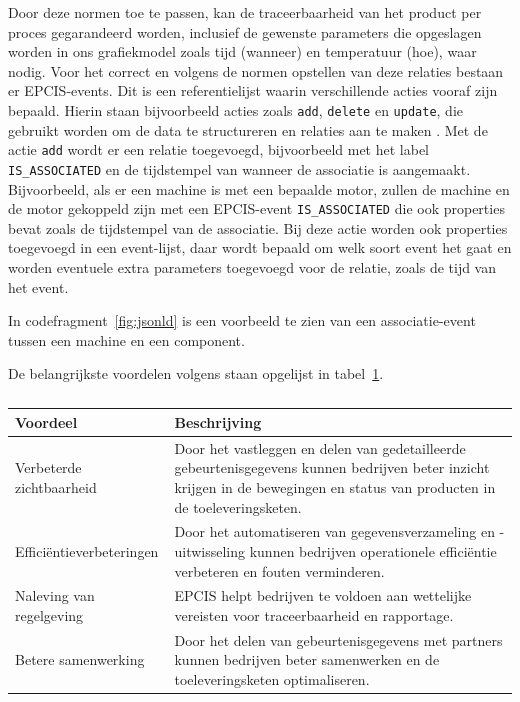 Door deze normen toe te passen, kan de traceerbaarheid van het product per proces gegarandeerd worden, inclusief de gewenste parameters die opgeslagen worden in ons grafiekmodel zoals tijd (wanneer) en temperatuur (hoe), waar nodig.
Voor het correct en volgens de normen opstellen van deze relaties bestaan er EPCIS-events. Dit is een referentielijst waarin verschillende acties vooraf zijn bepaald.
Hierin staan bijvoorbeeld acties zoals \texttt{add}, \texttt{delete} en \texttt{update}, die gebruikt worden om de data te structureren en relaties aan te maken \autocite{Byun2020}.
Met de actie \texttt{add} wordt er een relatie toegevoegd, bijvoorbeeld met het label \texttt{IS\_ASSOCIATED} en de tijdstempel van wanneer de associatie is aangemaakt.
Bijvoorbeeld, als er een machine is met een bepaalde motor, zullen de machine en de motor gekoppeld zijn met een EPCIS-event \texttt{IS\_ASSOCIATED} die ook properties bevat zoals de tijdstempel van de associatie.
Bij deze actie worden ook properties toegevoegd in een event-lijst, daar wordt bepaald om welk soort event het gaat en worden eventuele extra parameters toegevoegd voor de relatie, zoals de tijd van het event.

In codefragment~\ref{fig:jsonld} is een voorbeeld te zien van een associatie-event tussen een machine en een component.

De belangrijkste voordelen volgens \textcite{GS12025} staan opgelijst in tabel~\ref{tab:epcis-voordelen}.
\begin{table}[H]
    \centering
     \begin{tabular}{lp{}}
          \toprule
          \textbf{Voordeel} & \textbf{Beschrijving} \\
          \toprule
          Verbeterde zichtbaarheid & Door het vastleggen en delen van gedetailleerde gebeurtenisgegevens kunnen bedrijven beter inzicht krijgen in de bewegingen en status van producten in de toeleveringsketen. \\
          \midrule
          Efficiëntieverbeteringen & Door het automatiseren van gegevensverzameling en -uitwisseling kunnen bedrijven operationele efficiëntie verbeteren en fouten verminderen. \\
          \midrule
          Naleving van regelgeving & EPCIS helpt bedrijven te voldoen aan wettelijke vereisten voor traceerbaarheid en rapportage. \\
          \midrule
          Betere samenwerking & Door het delen van gebeurtenisgegevens met partners kunnen bedrijven beter samenwerken en de toeleveringsketen optimaliseren. \\
          \bottomrule
     \end{tabular}
     \caption[Belangrijkste voordelen van EPCIS volgens GS1]{\label{tab:epcis-voordelen}}
\end{table}

